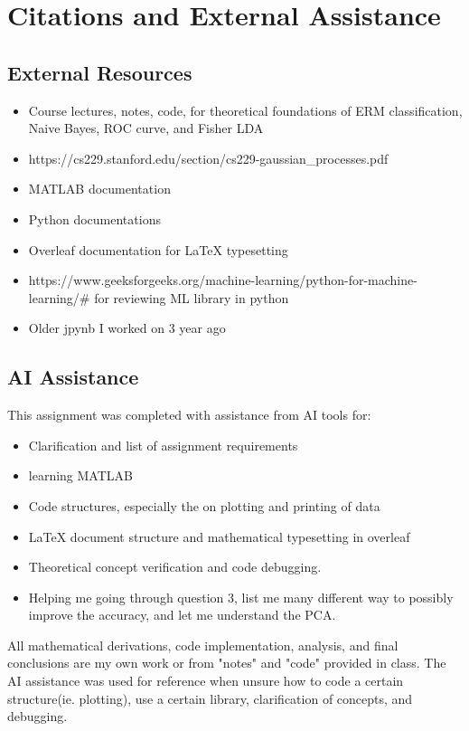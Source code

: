 \documentclass[12pt]{article}
\begin{document}
\newpage
\section*{Citations and External Assistance}

\subsection*{External Resources}
\begin{itemize}
    \item Course lectures, notes, code, for theoretical foundations of ERM classification, Naive Bayes, ROC curve, and Fisher LDA
    \item https://cs229.stanford.edu/section/cs229-gaussian_processes.pdf
    \item MATLAB documentation
    \item Python documentations
    \item Overleaf documentation for LaTeX typesetting
    \item https://www.geeksforgeeks.org/machine-learning/python-for-machine-learning/# for reviewing ML library in python
    \item Older jpynb I worked on 3 year ago
\end{itemize}

\subsection*{AI Assistance}
This assignment was completed with assistance from AI tools for:
\begin{itemize}
    \item Clarification and list of assignment requirements
    \item learning MATLAB
    \item Code structures, especially the on plotting and printing of data
    \item LaTeX document structure and mathematical typesetting in overleaf
    \item Theoretical concept verification and code debugging.
    \item Helping me going through question 3, list me many different way to possibly improve the accuracy, and let me understand the PCA.
\end{itemize}

All mathematical derivations, code implementation, analysis, and final conclusions are my own work or from "notes" and "code" provided in class. The AI assistance was used for reference when unsure how to code a certain structure(ie. plotting), use a certain library, clarification of concepts, and debugging.
\end{document}
